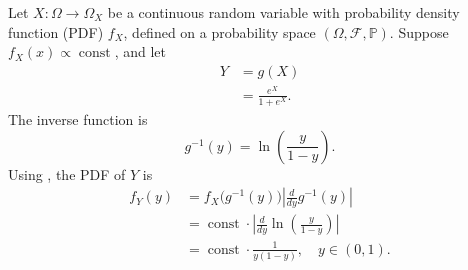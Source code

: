 \begin{example}
	Let $X: \Omega \to \Omega_X$ be a continuous random variable with probability density function (PDF) $f_X$, defined on a probability space $(\Omega, \mathcal{F}, \mathbb{P})$. Suppose $f_X(x) \propto \operatorname{const}$, and let
	\begin{equation}
		\begin{split}
			Y &= g(X)\\
			& = \frac{e^X}{1 + e^X}.
		\end{split}
	\end{equation}
	The inverse function is
	\begin{equation}
		g^{-1}(y) = \ln\left(\frac{y}{1-y}\right).
	\end{equation}
	Using , the PDF of $Y$ is
	\begin{equation}
		\begin{split}
			f_Y(y) &= f_X\bigl(g^{-1}(y)\bigr) \left| \frac{d}{dy} g^{-1}(y) \right| \\
			&= \operatorname{const} \cdot \left| \frac{d}{dy} \ln\left(\frac{y}{1-y}\right) \right| \\
			&= \operatorname{const} \cdot \frac{1}{y(1-y)}, \quad y \in (0,1).
		\end{split}
	\end{equation}
\end{example}


